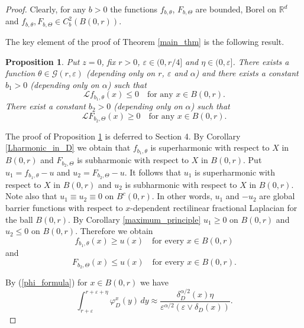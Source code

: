 \documentclass[a4paper,12pt,reqno]{amsart}
\newtheorem{proposition}[theorem]{Proposition}
\theoremstyle{definition}
\theoremstyle{remark}
\newcommand{\eps}{\varepsilon}
\newcommand{\calG}{\mathcal{G}}
\newcommand{\calL}{\mathcal{L}}
\newcommand{\R}{\mathds{R}}
\begin{document}
\begin{proof}
Clearly, for any $b > 0$  the functions $f_{b,\theta}$, $F_{b,\Theta}$ are bounded, Borel on $\R^d$ and $f_{b,\theta}, F_{b,\Theta} \in C_b^2(B(0,r))$. 

The key element of the proof of Theorem \ref{main_thm} is the following result.
\begin{proposition}
\label{f_b_estimate1}
Put $z = 0$, fix $r > 0$, $\eps \in (0,r/4]$ and $\eta \in (0,\eps]$. There exists a function $\theta \in \calG(r,\eps)$ (depending only on $r$, $\eps$ and $\alpha$)  and there exists a constant $b_1 > 0$ (depending only on $\alpha$) such that
$$
\calL f_{b_1,\theta}(x) \le 0 \quad \text{for any $x \in B(0,r)$.}
$$
There exist a constant $b_2 > 0$ (depending only on $\alpha$) such that
$$
\calL F_{b_2,\Theta}(x) \ge 0 \quad \text{for any $x \in B(0,r)$.}
$$
\end{proposition}

The proof of Proposition \ref{f_b_estimate1} is deferred to Section 4.
By Corollary \ref{Lharmonic_in_D} we obtain that $f_{b_1,\theta}$ is superharmonic with respect to $X$ in $B(0,r)$ and 
$F_{b_2,\Theta}$ is subharmonic with respect to $X$ in $B(0,r)$. Put $u_1 = f_{b_1,\theta} - u$ and $u_2 = F_{b_2,\Theta} - u$. It follows that $u_1$ is superharmonic with respect to $X$ in $B(0,r)$ and $u_2$ is subharmonic with respect to $X$ in $B(0,r)$. Note also that $u_1 \equiv u_2 \equiv 0$ on $B^c(0,r)$. In other words, $u_1$ and $-u_2$ are global barrier functions with respect to $x$-dependent rectilinear fractional Laplacian for the ball $B(0,r)$. By Corollary \ref{maximum_principle} $u_1 \ge 0$ on $B(0,r)$ and $u_2 \le 0$ on $B(0,r)$. Therefore we obtain
\begin{equation}
\label{f_b_1}
f_{b_1,\theta}(x) \ge u(x) \quad \text{for every $x \in B(0,r)$}
\end{equation}
and
\begin{equation}
\label{f_b_2}
F_{b_2,\Theta}(x) \le u(x) \quad \text{for every $x \in B(0,r)$.}
\end{equation}

By (\ref{phi_formula}) for $x \in B(0,r)$ we have
\begin{equation}
\label{phi_r_x_est}
\int_{r+\eps}^{r+\eps+\eta} \varphi_D^x(y) \, dy \approx \frac{\delta_D^{\alpha/2}(x) \eta}{\eps^{\alpha/2} (\eps \vee \delta_D(x))}.
\end{equation}


\end{proof}
\end{document}
